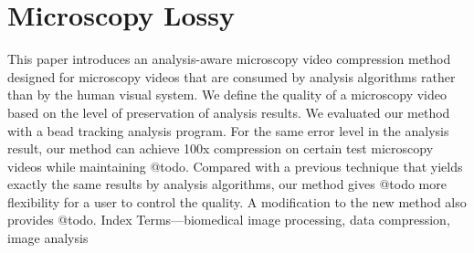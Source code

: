 
\chapter{Microscopy Lossy}

This paper introduces an analysis-aware microscopy video compression method designed for microscopy videos that are consumed by analysis algorithms rather than by the human visual system. We define the quality of a microscopy video based on the level of preservation of analysis results. We evaluated our method with a bead tracking analysis program. For the same error level in the analysis result, our method can achieve 100x compression on certain test microscopy videos while maintaining @todo. Compared with a previous technique that yields exactly the same results by analysis algorithms, our method gives @todo more flexibility for a user to control the quality.  A modification to the new method also provides @todo.
Index Terms—biomedical image processing, data compression, image analysis

